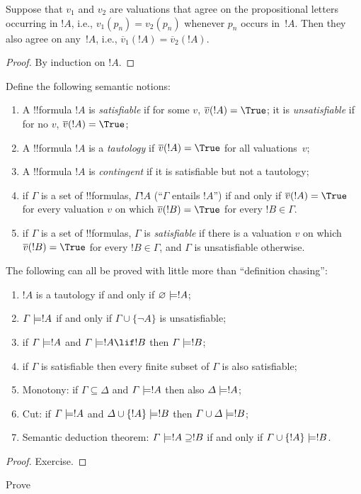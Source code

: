 \documentclass[../../include/open-logic-section]{subfiles}
\begin{document}
\begin{thm}  
Suppose that $v_1$ and $v_2$ are valuations that agree on the
propositional letters occurring in $!A$, i.e., $v_1(p_n) = v_2(p_n)$
whenever $p_n$ occurs in~$!A$. Then they also agree on any~$!A$,
i.e., $\overline{v}_1(!A) = \overline{v}_2(!A)$. 
\end{thm}

\begin{proof} 
By induction on $!A$. 
\end{proof}

\begin{defn} 
Define the following semantic notions:
\begin{enumerate} 
\item A !!{formula} $!A$ is \emph{satisfiable} if for some $v$,
  $\overline{v}(!A) = \True$; it is \emph{unsatisfiable} if for no
  $v$, $\overline{v}(!A) = \True$;
\item A !!{formula} $!A$ is a \emph{tautology} if $\overline{v}(!A) =
  \True$ for all valuations~$v$;
\item A !!{formula} $!A$ is \emph{contingent} if it is satisfiable but
  not a tautology;
\item if $\Gamma$ is a set of !!{formula}s, $\Gamma !A$ (``$\Gamma$
  entails $!A$'') if and only if $\overline{v}(!A) = \True$ for every
  valuation $v$ on which $\overline{v}(!B) = \True$ for every $!B \in
  \Gamma$. 
\item if $\Gamma$ is a set of !!{formula}s, $\Gamma$ is
  \emph{satisfiable} if there is a valuation $v$ on which
  $\overline{v}(!B) = \True$ for every $!B \in \Gamma$, and $\Gamma$
  is unsatisfiable otherwise. 
\end{enumerate} 
\end{defn}

\begin{prop}
The following can all be proved
with little more than ``definition chasing'': 
\begin{enumerate} 
\item $!A$ is a tautology if and only if
  $\varnothing \Entails !A$; 
\item $\Gamma \Entails !A$ if and only if $\Gamma \cup \{ \lnot\!A\}$
  is unsatisfiable; 
\item if $\Gamma \Entails !A$ and $\Gamma \Entails !A \lif !B$ then
  $\Gamma \Entails !B$;
\item if $\Gamma$ is satisfiable then every finite subset of $\Gamma$
  is also satisfiable; 
\item {} Monotony: if $\Gamma \subseteq \Delta$
  and $\Gamma \Entails !A$ then also $\Delta \Entails !A$;
\item {} Cut: if $\Gamma \Entails !A$ and $\Delta \cup \{
!A\} \Entails !B$ then $\Gamma \cup \Delta \Entails !B$; 
\item
{} Semantic deduction theorem: $\Gamma
\Entails !A \supseteq !B$ if and only if $\Gamma \cup \{!A\} \Entails
!B$.
\end{enumerate}
\end{prop}

\begin{proof}
Exercise.
\end{proof}

\begin{prob}
Prove 
\end{prob}
\end{document}
